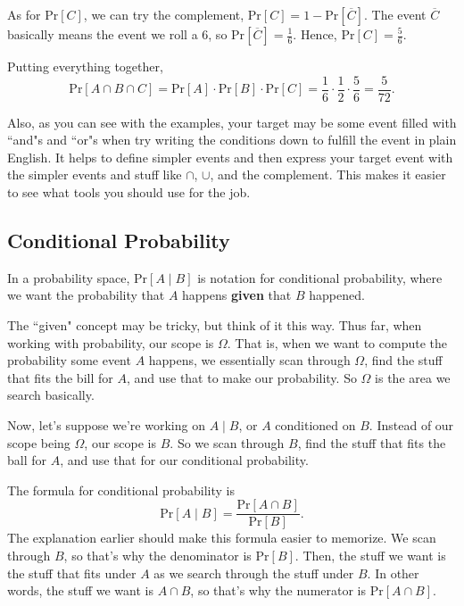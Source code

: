 \documentclass[11pt]{scrartcl}
\begin{document}
As for $\text{Pr}[C]$, we can try the complement, $\text{Pr}[C] = 1 - \text{Pr}[\overline{C}]$. The event $\overline{C}$ basically means the event we roll a 6, so $\text{Pr}[\overline{C}] = \frac{1}{6}$. Hence, $\text{Pr}[C] = \frac{5}{6}$.

Putting everything together, \[\text{Pr}[A \cap B \cap C] = \text{Pr}[A] \cdot \text{Pr}[B] \cdot \text{Pr}[C] = \frac{1}{6} \cdot \frac{1}{2} \cdot \frac{5}{6} = \frac{5}{72}.\]

\begin{advice}
Also, as you can see with the examples, your target may be some event filled with ``and"s and ``or"s when try writing the conditions down to fulfill the event in plain English. It helps to define simpler events and then express your target event with the simpler events and stuff like $\cap$, $\cup$, and the complement. This makes it easier to see what tools you should use for the job.
\end{advice}

\subsection{Conditional Probability}

In a probability space, $\text{Pr}[A \mid B]$ is notation for conditional probability, where we want the probability that $A$ happens \textbf{given} that $B$ happened.

The ``given" concept may be tricky, but think of it this way. Thus far, when working with probability, our scope is $\Omega$. That is, when we want to compute the probability some event $A$ happens, we essentially scan through $\Omega$, find the stuff that fits the bill for $A$, and use that to make our probability. So $\Omega$ is the area we search basically.

Now, let's suppose we're working on $A \mid B$, or $A$ conditioned on $B$. Instead of our scope being $\Omega$, our scope is $B$. So we scan through $B$, find the stuff that fits the ball for $A$, and use that for our conditional probability.

The formula for conditional probability is \[\text{Pr}[A \mid B] = \frac{\text{Pr}[A \cap B]}{\text{Pr}[B]}.\] The explanation earlier should make this formula easier to memorize. We scan through $B$, so that's why the denominator is $\text{Pr}[B]$. Then, the stuff we want is the stuff that fits under $A$ as we search through the stuff under $B$. In other words, the stuff we want is $A \cap B$, so that's why the numerator is $\text{Pr}[A \cap B]$.
\end{document}
